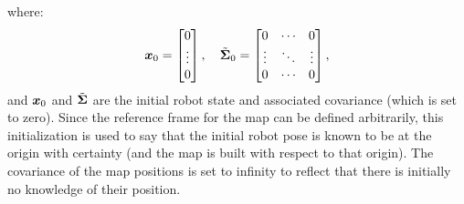 where:
\begin{equation*}
\bm{x}_0 = \begin{bmatrix}
0 \\ \vdots \\ 0
\end{bmatrix}, \quad \tilde{\bm{\Sigma}}_0 = \begin{bmatrix}
0 & \cdots & 0 \\ \vdots & \ddots & \vdots \\ 0 & \cdots & 0
\end{bmatrix},
\end{equation*}
and $\bm{x}_0$ and $\tilde{\bm{\Sigma}}$ are the initial robot state and associated covariance (which is set to zero).
Since the reference frame for the map can be defined arbitrarily, this initialization is used to say that the initial robot pose is known to be at the origin with certainty (and the map is built with respect to that origin). The covariance of the map positions is set to infinity to reflect that there is initially no knowledge of their position.




